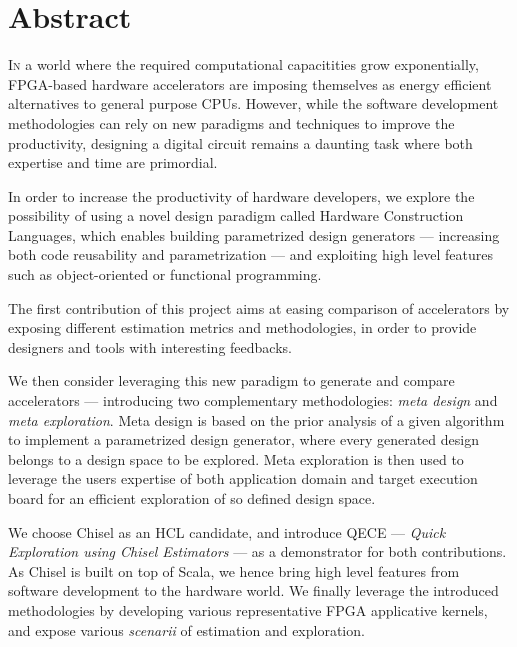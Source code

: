 
\clearpage
{}
{}
\chapter*{Abstract}
\lettrine[lines=2]{I}{n} a world where the required computational capacitities grow exponentially, FPGA-based hardware accelerators are imposing themselves as energy efficient alternatives to general purpose CPUs.
However, while the software development methodologies can rely on new paradigms and techniques to improve the productivity, designing a digital circuit remains a daunting task where both expertise and time are primordial.

In order to increase the productivity of hardware developers, we explore the possibility of using a novel design paradigm called Hardware Construction Languages, which enables building parametrized design generators --- increasing both code reusability and parametrization --- and exploiting high level features such as object-oriented or functional programming.

The first contribution of this project aims at easing comparison of accelerators by exposing different estimation metrics and methodologies, in order to provide designers and tools with interesting feedbacks.

We then consider leveraging this new paradigm to generate and compare accelerators --- introducing two complementary methodologies: {\it meta design} and {\it meta exploration}.
Meta design is based on the prior analysis of a given algorithm to implement a parametrized design generator, where every generated design belongs to a design space to be explored.
Meta exploration is then used to leverage the users expertise of both application domain and target execution board for an efficient exploration of so defined design space.

We choose Chisel as an HCL candidate, and introduce QECE --- {\it Quick Exploration using Chisel Estimators} --- as a demonstrator for both contributions.
As Chisel is built on top of Scala, we hence bring high level features from software development to the hardware world.
We finally leverage the introduced methodologies by developing various representative FPGA applicative kernels, and expose various {\it scenarii} of estimation and exploration.


